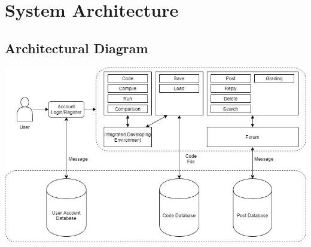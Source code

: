 \chapter{System Architecture}
\section{Architectural Diagram}
\includegraphics[scale=0.5]{Doc/Graphics/architectural_diagram}
